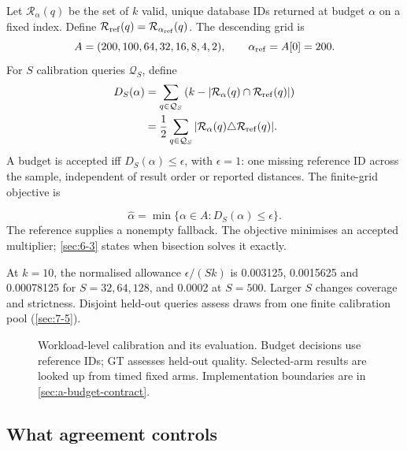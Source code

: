 Let $\mathcal R_\alpha(q)$ be the set of $k$ valid, unique database IDs
returned at budget $\alpha$ on a fixed index. Define
$\mathcal R_{\rm ref}(q)=\mathcal R_{\alpha_{\rm ref}}(q)$. The descending grid is
\begin{equation}
 A=(200,100,64,32,16,8,4,2),\qquad \alpha_{\rm ref}=A[0]=200.
 \label{eq:6-grid}
\end{equation}
For $S$ calibration queries $\mathcal Q_S$, define
\begin{equation}
 \begin{aligned}
 D_S(\alpha)
 &=\sum_{q\in\mathcal Q_S}
   \left(k-|\mathcal R_\alpha(q)\cap\mathcal R_{\rm ref}(q)|\right)\\
 &=\frac12\sum_{q\in\mathcal Q_S}
   |\mathcal R_\alpha(q)\triangle\mathcal R_{\rm ref}(q)|.
 \end{aligned}
 \label{eq:6-agreement}
\end{equation}
A budget is accepted iff $D_S(\alpha)\leq\epsilon$, with $\epsilon=1$:
one missing reference ID across the sample, independent of result order
or reported distances. The finite-grid objective is

\begin{equation}
 \widehat\alpha=\min\{\alpha\in A:D_S(\alpha)\leq\epsilon\}.
 \label{eq:6-selection-objective}
\end{equation}
The reference supplies a nonempty fallback. The objective minimises an
accepted multiplier; \cref{sec:6-3} states when bisection solves it exactly.

At $k=10$, the normalised allowance $\epsilon/(Sk)$ is 0.003125,
0.0015625 and 0.00078125 for $S=32,64,128$, and 0.0002 at $S=500$.
Larger $S$ changes coverage and strictness. Disjoint held-out queries assess draws from one finite calibration pool (\cref{sec:7-5}).

\begin{figure}[htbp]
\centering

\caption[Workload-level calibration and evaluation]{Workload-level calibration and its evaluation. Budget decisions
use reference IDs; GT assesses held-out quality. Selected-arm results
are looked up from timed fixed arms. Implementation boundaries are in
\cref{sec:a-budget-contract}.}
\label{fig:6-calibration}
\end{figure}

\subsection{What agreement controls}

